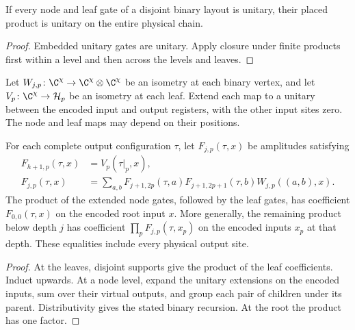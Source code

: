 \begin{lemma}
    \label{lem:ldp_interval_tree_unitary_product}
    \leanok
    If every node and leaf gate of a disjoint binary layout is unitary,
    their placed product is unitary on the entire physical chain.
\end{lemma}
\begin{proof}\leanok
    Embedded unitary gates are unitary. Apply closure under finite
    products first within a level and then across the levels and leaves.
\end{proof}

\begin{definition}
    \label{def:ldp_interval_tree_extensions}
    \leanok
    Let $W_{j,p}\colon\C^\chi\to\C^\chi\otimes\C^\chi$ be an
    isometry at each binary vertex, and let
    $V_p\colon\C^\chi\to\mathcal H_p$ be an isometry at each leaf.
    Extend each map to a unitary between the encoded input and output
    registers, with the other input sites zero. The node and leaf maps
    may depend on their positions.
\end{definition}

\begin{lemma}
    \label{lem:ldp_interval_tree_coefficients}
    \leanok
    For each complete output configuration $\tau$, let $F_{j,p}(\tau,x)$
    be amplitudes satisfying
    \begin{align*}
        F_{h+1,p}(\tau,x) & =V_p(\tau|_p,x), \\
        F_{j,p}(\tau,x)   & =\sum_{a,b}
        F_{j+1,2p}(\tau,a)F_{j+1,2p+1}(\tau,b)W_{j,p}((a,b),x).
    \end{align*}
    The product of the extended node gates, followed by the leaf gates,
    has coefficient $F_{0,0}(\tau,x)$ on the encoded root input $x$.
    More generally, the remaining product below depth $j$ has coefficient
    $\prod_pF_{j,p}(\tau,x_p)$ on the encoded inputs $x_p$ at that depth.
    These equalities include every physical output site.
\end{lemma}
\begin{proof}\leanok
    At the leaves, disjoint supports give the product of the leaf
    coefficients. Induct upwards. At a node level, expand the unitary
    extensions on the encoded inputs, sum over their virtual outputs,
    and group each pair of children under its parent. Distributivity
    gives the stated binary recursion. At the root the product has one
    factor.
\end{proof}

